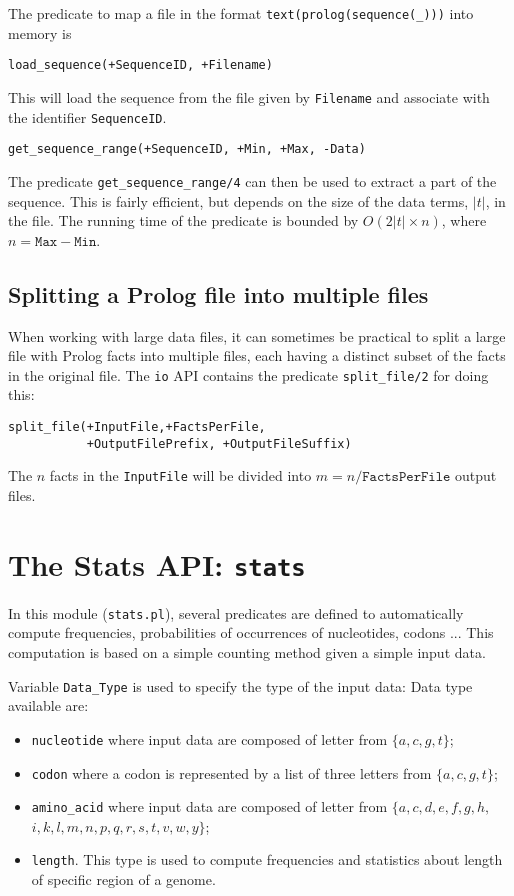 \documentclass{book}
\begin{document}
The predicate to map a file in the format \texttt{text(prolog(sequence(\_)))} into memory is
\begin{verbatim}
load_sequence(+SequenceID, +Filename)
\end{verbatim}

This will load the sequence from the file given by \texttt{Filename} and associate with the 
identifier \texttt{SequenceID}.


\begin{verbatim}
get_sequence_range(+SequenceID, +Min, +Max, -Data)
\end{verbatim}

The predicate 
\texttt{get\_sequence\_range/4}
can then be used to extract a part of the sequence. This is fairly efficient, but 
depends on the size of the data terms, $|t|$, in the file. The running time of the predicate
is bounded by $O(2 |t| \times n)$, where $n = \texttt{Max}-\texttt{Min}$.

\subsection{Splitting a Prolog file into multiple files}

When working with large data files, it can sometimes be practical to split a large 
file with Prolog facts into multiple files, each having a distinct subset of the facts 
in the original file.
The \texttt{io} API contains the predicate \texttt{split\_file/2} for doing this:

\begin{verbatim}
split_file(+InputFile,+FactsPerFile,
           +OutputFilePrefix, +OutputFileSuffix)
\end{verbatim}

The $n$ facts in the \texttt{InputFile} will be divided into $m = n / \texttt{FactsPerFile}$ output files. 

\section{The Stats API: \texttt{stats}}

In this module (\texttt{stats.pl}), several predicates are defined to automatically compute
frequencies, probabilities of occurrences of nucleotides, codons ... This computation
is based on a simple counting method given a simple input data. 

Variable \texttt{Data\_Type} is used to specify the type of the input data:
Data type available are:
\begin{itemize}
\item \texttt{nucleotide} where input data are composed of letter from $\{a,c,g,t\}$;
\item \texttt{codon} where a codon is represented by a list of three letters from $\{a,c,g,t\}$;
\item \texttt{amino\_acid} where input data are composed of letter from $\{a,c,d,e,f,g,h,$
$i,k,l,m,n,p,q,r,s,t,v,w,y\}$;
\item \texttt{length}. This type is used to compute frequencies and statistics about length of specific region of a genome. 
\end{itemize} 
\end{document}
